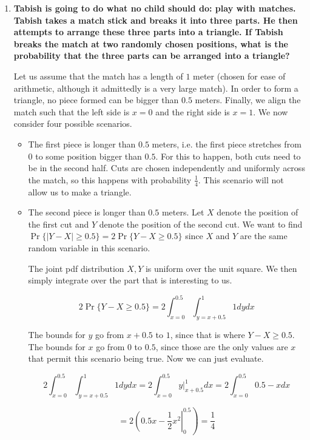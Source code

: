 \documentclass{article}
\begin{document}
\begin{enumerate}[label=(\alph*)]
    \item \textbf{Tabish is going to do what no child should do: play with matches. Tabish takes a match stick and breaks it into three parts. He then attempts to arrange these three parts into a triangle. If Tabish breaks the match at two randomly chosen positions, what is the probability that the three parts can be arranged into a triangle?}
    
    Let us assume that the match has a length of $1$ meter (chosen for ease of arithmetic, although it admittedly is a very large match). In order to form a triangle, no piece formed can be bigger than $0.5$ meters. Finally, we align the match such that the left side is $x = 0$ and the right side is $x = 1$. We now consider four possible scenarios.
    
    \begin{itemize}
        \item The first piece is longer than $0.5$ meters, i.e. the first piece stretches from $0$ to some position bigger than $0.5$. For this to happen, both cuts need to be in the second half. Cuts are chosen independently and uniformly across the match, so this happens with probability $\frac{1}{4}$. This scenario will not allow us to make a triangle.
        \item The second piece is longer than $0.5$ meters. Let $X$ denote the position of the first cut and $Y$ denote the position of the second cut. We want to find $\Pr\{\vert Y - X \vert \geq 0.5\} = 2\Pr\{Y - X \geq 0.5\}$ since $X$ and $Y$ are the same random variable in this scenario.
        
        The joint pdf distribution $X, Y$ is uniform over the unit square. We then simply integrate over the part that is interesting to us.
        
        $$2\Pr\{Y - X \geq 0.5\} = 2\int_{x = 0}^{0.5} \int_{y = x + 0.5}^1 1 dydx$$
        
        The bounds for $y$ go from $x + 0.5$ to $1$, since that is where $Y - X \geq 0.5$. The bounds for $x$ go from $0$ to $0.5$, since those are the only values are $x$ that permit this scenario being true. Now we can just evaluate.
        
        $$2\int_{x = 0}^{0.5} \int_{y = x + 0.5}^1 1 dydx = 2\int_{x = 0}^{0.5} y \vert_{x + 0.5}^1 dx = 2\int_{x = 0}^{0.5} 0.5 - x dx$$
        
        $$= 2 \left. \left(0.5x - \frac{1}{2}x^2 \right\rvert_{0}^{0.5} \right) = \frac{1}{4}$$
        

\end{itemize}
\end{enumerate}
\end{document}
